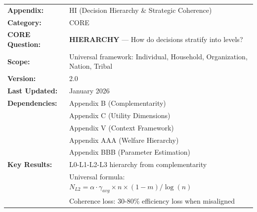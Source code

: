 %
%
%
%
%


\begin{tcolorbox}[colback=green!5!white, colframe=green!75!black,
    title=\textbf{CORE Appendix: Decision Hierarchy \& Strategic Coherence}]

\begin{tabular}{@{}ll@{}}
\textbf{Appendix:} & HI (Decision Hierarchy \& Strategic Coherence) \\
\textbf{Category:} & CORE \\
\textbf{CORE Question:} & \textbf{HIERARCHY} --- How do decisions stratify into levels? \\
\textbf{Scope:} & Universal framework: Individual, Household, Organization, Nation, Tribal \\
\textbf{Version:} & 2.0 \\
\textbf{Last Updated:} & January 2026 \\
\textbf{Dependencies:} & Appendix B (Complementarity) \\
 & Appendix C (Utility Dimensions) \\
 & Appendix V (Context Framework) \\
 & Appendix AAA (Welfare Hierarchy) \\
 & Appendix BBB (Parameter Estimation) \\
\textbf{Key Results:} & L0-L1-L2-L3 hierarchy from complementarity \\
 & Universal formula: $N_{L2} = \alpha \cdot \gamma_{avg} \times n \times (1-m) / \log(n)$ \\
 & Coherence loss: 30-80\% efficiency loss when misaligned \\
\end{tabular}

\end{tcolorbox}


